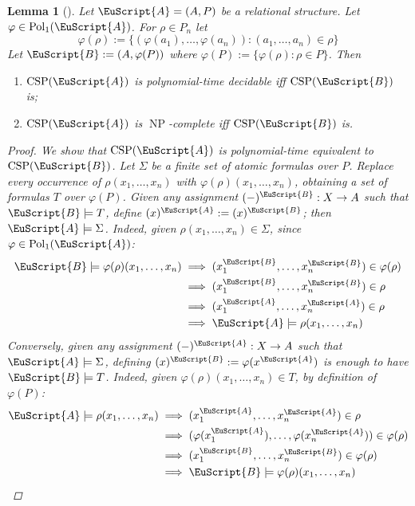 \documentclass{amsart}
\theoremstyle{plain}
\newtheorem{lemma}[theorem]{Lemma}
\theoremstyle{definition}
\theoremstyle{remark}
\def\phi{\varphi}
\DeclareMathOperator{\CSP}{CSP}
\DeclareMathOperator{\Pol}{Pol}
\DeclareMathOperator{\NP}{NP}
\begin{document}
\begin{lemma}[\cite{jeavons}]
    \label{image}
    Let $\EuScript{A}=(A, P)$ be a relational structure. 
    Let $\phi \in \Pol_1(\EuScript{A})$. 
    For $\rho \in P_n$ let 
    \begin{equation*}
        \phi(\rho):=\{(\phi(a_1), \ldots, \phi(a_n)):(a_1, \ldots, a_n) \in \rho\}
    \end{equation*}
    Let $\EuScript{B}:=(A, \phi(P))$ where $\phi(P):=\{\phi(\rho): \rho \in P\}$.
    Then 
    \begin{enumerate}
        \item $\CSP(\EuScript{A})$ is polynomial-time decidable iff $\CSP(\EuScript{B})$ is; 
        \item $\CSP(\EuScript{A})$ is $\NP$-complete iff $\CSP(\EuScript{B})$ is. 
    \end{enumerate}
    \begin{proof}
        We show that $\CSP(\EuScript{A})$ is polynomial-time equivalent to $\CSP(\EuScript{B})$. 
        Let $\Sigma$ be a finite set of atomic formulas over $P$. 
        Replace every occurrence of $\rho(x_1, \ldots, x_n)$ with $\phi(\rho)(x_1, \ldots, x_n)$, 
        obtaining a set of formulas $T$ over $\phi(P)$. 
        Given any assignment $(-)^{\EuScript{B}}: X \to A$ such that $\EuScript{B} \models T$, 
        define $(x)^{\EuScript{A}}:=(x)^{\EuScript{B}}$; then $\EuScript{A} \models \Sigma$.
        Indeed, given $\rho(x_1, \ldots, x_n) \in \Sigma$, since $\phi \in \Pol_1(\EuScript{A})$: 
        \begin{align*}
            \EuScript{B} \models \phi(\rho)(x_1, \ldots, x_n) & \implies (x_1^{\EuScript{B}}, \ldots, x_n^{\EuScript{B}}) \in \phi(\rho) \\
            & \implies (x_1^{\EuScript{B}}, \ldots, x_n^{\EuScript{B}}) \in \rho \\
            & \implies (x_1^{\EuScript{A}}, \ldots, x_n^{\EuScript{A}}) \in \rho \\
            & \implies \EuScript{A} \models \rho(x_1, \ldots, x_n)
        \end{align*} 
        Conversely, given any assignment $(-)^{\EuScript{A}}: X \to A$ such that $\EuScript{A} \models \Sigma$,
        defining $(x)^{\EuScript{B}}:=\phi(x^{\EuScript{A}})$ is enough to have $\EuScript{B} \models T$.  
        Indeed, given $\phi(\rho)(x_1, \ldots, x_n) \in T$, by definition of $\phi(P)$: 
        \begin{align*}
            \EuScript{A} \models \rho(x_1, \ldots, x_n) & \implies (x_1^{\EuScript{A}}, \ldots, x_n^{\EuScript{A}}) \in \rho \\
            & \implies (\phi(x_1^{\EuScript{A}}), \ldots, \phi(x_n^{\EuScript{A}})) \in \phi(\rho) \\
            & \implies  (x_1^{\EuScript{B}}, \ldots, x_n^{\EuScript{B}}) \in \phi(\rho) \\
            & \implies \EuScript{B} \models \phi(\rho)(x_1, \ldots, x_n) \qedhere
        \end{align*} 
    \end{proof}
\end{lemma}
\end{document}
